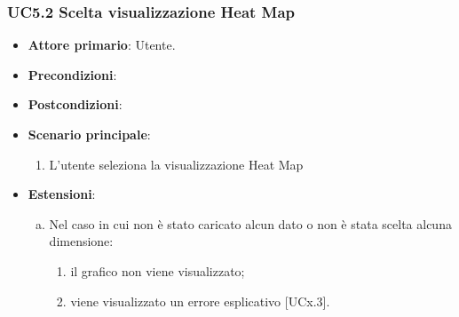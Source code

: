 \subsubsection{UC5.2 Scelta visualizzazione Heat Map}
\begin{figure}[h]
\centering
\caption{}
\end{figure}
\begin{itemize}
	\item \textbf{Attore primario}: Utente.
	\item \textbf{Precondizioni}:
	\item \textbf{Postcondizioni}:
	\item \textbf{Scenario principale}:
		\begin{enumerate}
			\item L'utente seleziona la visualizzazione Heat Map
		\end{enumerate}
	\item \textbf{Estensioni}:
	\begin{enumerate}[(a)]
		\item Nel caso in cui non è stato caricato alcun dato o non è stata scelta alcuna dimensione:
		\begin{enumerate}[1.]
			\item il grafico non viene visualizzato;
			\item viene visualizzato un errore esplicativo [UCx.3].
		\end{enumerate}
	\end{enumerate}
\end{itemize}